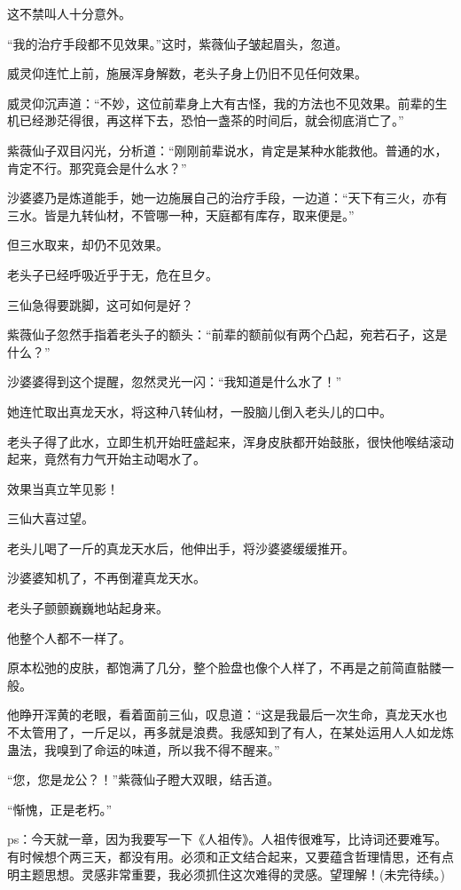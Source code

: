 \begin{this_body}
这不禁叫人十分意外。

“我的治疗手段都不见效果。”这时，紫薇仙子皱起眉头，忽道。

威灵仰连忙上前，施展浑身解数，老头子身上仍旧不见任何效果。

威灵仰沉声道：“不妙，这位前辈身上大有古怪，我的方法也不见效果。前辈的生机已经渺茫得很，再这样下去，恐怕一盏茶的时间后，就会彻底消亡了。”

紫薇仙子双目闪光，分析道：“刚刚前辈说水，肯定是某种水能救他。普通的水，肯定不行。那究竟会是什么水？”

沙婆婆乃是炼道能手，她一边施展自己的治疗手段，一边道：“天下有三火，亦有三水。皆是九转仙材，不管哪一种，天庭都有库存，取来便是。”

但三水取来，却仍不见效果。

老头子已经呼吸近乎于无，危在旦夕。

三仙急得要跳脚，这可如何是好？

紫薇仙子忽然手指着老头子的额头：“前辈的额前似有两个凸起，宛若石子，这是什么？”

沙婆婆得到这个提醒，忽然灵光一闪：“我知道是什么水了！”

她连忙取出真龙天水，将这种八转仙材，一股脑儿倒入老头儿的口中。

老头子得了此水，立即生机开始旺盛起来，浑身皮肤都开始鼓胀，很快他喉结滚动起来，竟然有力气开始主动喝水了。

效果当真立竿见影！

三仙大喜过望。

老头儿喝了一斤的真龙天水后，他伸出手，将沙婆婆缓缓推开。

沙婆婆知机了，不再倒灌真龙天水。

老头子颤颤巍巍地站起身来。

他整个人都不一样了。

原本松弛的皮肤，都饱满了几分，整个脸盘也像个人样了，不再是之前简直骷髅一般。

他睁开浑黄的老眼，看着面前三仙，叹息道：“这是我最后一次生命，真龙天水也不太管用了，一斤足以，再多就是浪费。我感知到了有人，在某处运用人人如龙炼蛊法，我嗅到了命运的味道，所以我不得不醒来。”

“您，您是龙公？！”紫薇仙子瞪大双眼，结舌道。

“惭愧，正是老朽。”

ps：今天就一章，因为我要写一下《人祖传》。人祖传很难写，比诗词还要难写。有时候想个两三天，都没有用。必须和正文结合起来，又要蕴含哲理情思，还有点明主题思想。灵感非常重要，我必须抓住这次难得的灵感。望理解！(未完待续。)

\end{this_body}

